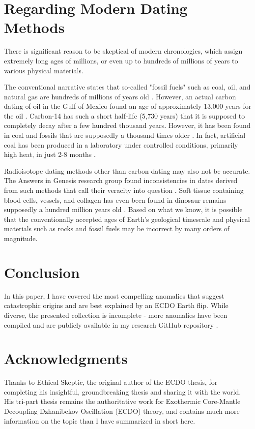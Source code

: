 \documentclass[10pt,twocolumn,letterpaper]{article}
\begin{document}
\section{Regarding Modern Dating Methods}

There is significant reason to be skeptical of modern chronologies, which assign extremely long ages of millions, or even up to hundreds of millions of years to various physical materials.

The conventional narrative states that so-called "fossil fuels" such as coal, oil, and natural gas are hundreds of millions of years old \cite{104}. However, an actual carbon dating of oil in the Gulf of Mexico found an age of approximately 13,000 years for the oil \cite{105}. Carbon-14 has such a short half-life (5,730 years) that it is supposed to completely decay after a few hundred thousand years. However, it has been found in coal and fossils that are supposedly a thousand times older \cite{106}. In fact, artificial coal has been produced in a laboratory under controlled conditions, primarily high heat, in just 2-8 months \cite{107}.

Radioisotope dating methods other than carbon dating may also not be accurate. The Answers in Genesis research group found inconsistencies in dates derived from such methods that call their veracity into question \cite{108}. Soft tissue containing blood cells, vessels, and collagen has even been found in dinosaur remains supposedly a hundred million years old \cite{109,110}. Based on what we know, it is possible that the conventionally accepted ages of Earth's geological timescale and physical materials such as rocks and fossil fuels may be incorrect by many orders of magnitude.

\section{Conclusion}

In this paper, I have covered the most compelling anomalies that suggest catastrophic origins and are best explained by an ECDO Earth flip. While diverse, the presented collection is incomplete - more anomalies have been compiled and are publicly available in my research GitHub repository \cite{2}.

\section{Acknowledgments}

Thanks to Ethical Skeptic, the original author of the ECDO thesis, for completing his insightful, groundbreaking thesis and sharing it with the world. His tri-part thesis \cite{1} remains the authoritative work for Exothermic Core-Mantle Decoupling Dzhanibekov Oscillation (ECDO) theory, and contains much more information on the topic than I have summarized in short here.
\end{document}
